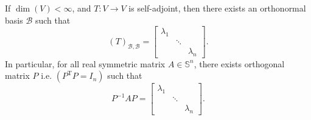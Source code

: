 \begin{corollary}
If \(\dim(V) < \infty\), and \(T : V \rightarrow V\) is self-adjoint, then there exists an orthonormal basis \(\mathcal{B}\) such that
\[(T)_{\mathcal{B},\mathcal{B}} = \begin{bmatrix} \lambda_1 &  &  \\  & \ddots &  \\  &  & \lambda_n \end{bmatrix}.\]
In particular, for all real symmetric matrix \(A \in  {\mathbb{S}}^{n}\), there exists orthogonal matrix \(P\) i.e. \(\left( {{P}^{\mathrm{T}}P = {I}_{n}}\right)\) such that
\[
{P}^{-1}{AP} = \begin{bmatrix} \lambda_1 &  &  \\  & \ddots &  \\  &  & \lambda_n \end{bmatrix}.
\]
\end{corollary}
